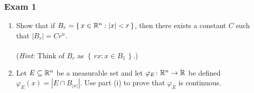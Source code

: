 \subsubsection{Exam 1}
\setcounter{exercise}{0}
\setcounter{equation}{0}


\begin{problem}
\end{problem}
\begin{solution}
\end{solution}

\begin{problem}
\end{problem}
\begin{solution}
\end{solution}

\begin{problem}
\hfill
\begin{enumerate}[label=(\roman*),noitemsep]
\item Show that if $B_r=\left\{\, x \in\mathbb{R}^n:| x |<r\,\right\}$,
  then there exists a constant $C$ such that $|B_r|=Cr^n$.
\\\\
(\emph{Hint}: Think of $B_r$ as $\left\{\,r x : x \in B_1\,\right\}$.)
\item Let $E\subseteq\mathbb{R}^n$ be a measurable set and let
  $\varphi_E\colon\mathbb{R}^n\to\mathbb{R}$ be defined
  $\varphi_E( x )=\left|E\cap B_{| x |}\right|$. Use part (i) to prove
    that $\varphi_E$ is continuous.
\end{enumerate}
\end{problem}
